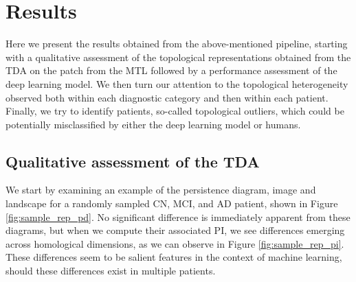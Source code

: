 \documentclass{article}
\begin{document}
\section{Results}\label{sec:results}

Here we present the results obtained from the above-mentioned pipeline, starting with a qualitative assessment of the topological representations obtained from the TDA on the patch from the MTL followed by a performance assessment of the deep learning model. We then turn our attention to the topological heterogeneity observed both within each diagnostic category and then within each patient. Finally, we try to identify patients, so-called topological outliers, which could be potentially misclassified by either the deep learning model or humans.

\subsection{Qualitative assessment of the TDA}

We start by examining an example of the persistence diagram, image and landscape for a randomly sampled CN, MCI, and AD patient, shown in Figure \ref{fig:sample_rep_pd}. No significant difference is immediately apparent from these diagrams, but when we compute their associated PI, we see differences emerging across homological dimensions, as we can observe in Figure \ref{fig:sample_rep_pi}. These differences seem to be salient features in the context of machine learning, should these differences exist in multiple patients.
\end{document}

